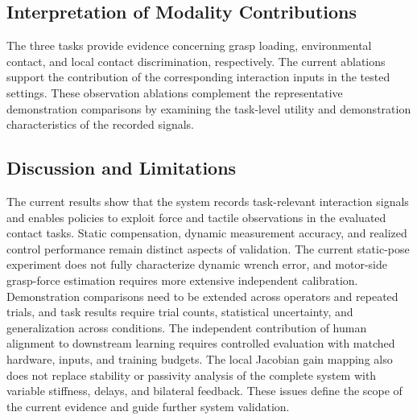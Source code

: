 \subsection{Interpretation of Modality Contributions}

The three tasks provide evidence concerning grasp loading, environmental contact, and local contact discrimination, respectively.
The current ablations support the contribution of the corresponding interaction inputs in the tested settings.
These observation ablations complement the representative demonstration comparisons by examining the task-level utility and demonstration characteristics of the recorded signals.

\subsection{Discussion and Limitations}

The current results show that the system records task-relevant interaction signals and enables policies to exploit force and tactile observations in the evaluated contact tasks.
Static compensation, dynamic measurement accuracy, and realized control performance remain distinct aspects of validation.
The current static-pose experiment does not fully characterize dynamic wrench error, and motor-side grasp-force estimation requires more extensive independent calibration.
Demonstration comparisons need to be extended across operators and repeated trials, and task results require trial counts, statistical uncertainty, and generalization across conditions.
The independent contribution of human alignment to downstream learning requires controlled evaluation with matched hardware, inputs, and training budgets.
The local Jacobian gain mapping also does not replace stability or passivity analysis of the complete system with variable stiffness, delays, and bilateral feedback.
These issues define the scope of the current evidence and guide further system validation.

